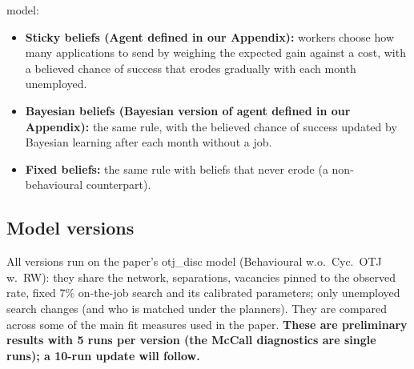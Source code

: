 \documentclass[10pt]{article}
\begin{document}
model:
\begin{itemize}[leftmargin=*]
  \item \textbf{Sticky beliefs (Agent defined in our Appendix):} workers choose how many applications to send by weighing the expected gain
  against a cost, with a believed chance of success that erodes gradually with each month unemployed.
  \item \textbf{Bayesian beliefs (Bayesian version of agent defined in our Appendix):} the same rule, with the believed chance of success updated by Bayesian
  learning after each month without a job.
  \item \textbf{Fixed beliefs:} the same rule with beliefs that never erode (a non-behavioural counterpart).
\end{itemize}
\subsection*{Model versions}
All versions run on the paper's otj\_disc model (Behavioural w.o.\ Cyc.\ OTJ w.\ RW): they share the network,
separations, vacancies pinned to the observed rate, fixed 7\% on-the-job search and its calibrated parameters; only
unemployed search changes (and who is matched under the planners). They are compared across some of the main fit
measures used in the paper. \textbf{These are preliminary results with 5 runs per version (the McCall diagnostics are
single runs); a 10-run update will follow.}
\end{document}
